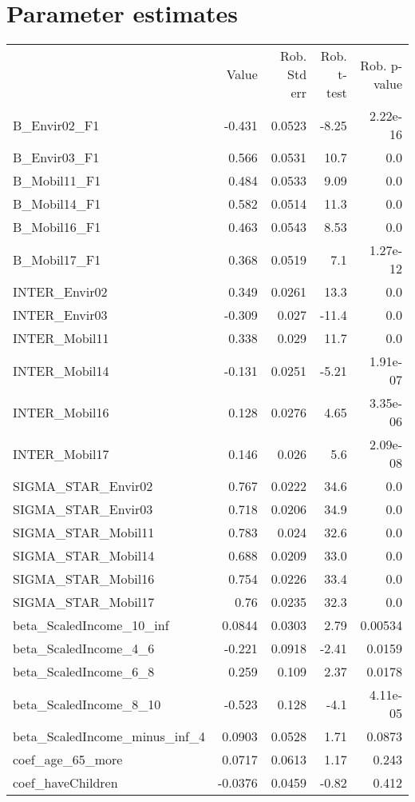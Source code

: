 \section{Parameter estimates}
\begin{tabular}{lrrrr}
 & Value & Rob. Std err & Rob. t-test & Rob. p-value \\
B_Envir02_F1 & -0.431 & 0.0523 & -8.25 & 2.22e-16 \\
B_Envir03_F1 & 0.566 & 0.0531 & 10.7 & 0.0 \\
B_Mobil11_F1 & 0.484 & 0.0533 & 9.09 & 0.0 \\
B_Mobil14_F1 & 0.582 & 0.0514 & 11.3 & 0.0 \\
B_Mobil16_F1 & 0.463 & 0.0543 & 8.53 & 0.0 \\
B_Mobil17_F1 & 0.368 & 0.0519 & 7.1 & 1.27e-12 \\
INTER_Envir02 & 0.349 & 0.0261 & 13.3 & 0.0 \\
INTER_Envir03 & -0.309 & 0.027 & -11.4 & 0.0 \\
INTER_Mobil11 & 0.338 & 0.029 & 11.7 & 0.0 \\
INTER_Mobil14 & -0.131 & 0.0251 & -5.21 & 1.91e-07 \\
INTER_Mobil16 & 0.128 & 0.0276 & 4.65 & 3.35e-06 \\
INTER_Mobil17 & 0.146 & 0.026 & 5.6 & 2.09e-08 \\
SIGMA_STAR_Envir02 & 0.767 & 0.0222 & 34.6 & 0.0 \\
SIGMA_STAR_Envir03 & 0.718 & 0.0206 & 34.9 & 0.0 \\
SIGMA_STAR_Mobil11 & 0.783 & 0.024 & 32.6 & 0.0 \\
SIGMA_STAR_Mobil14 & 0.688 & 0.0209 & 33.0 & 0.0 \\
SIGMA_STAR_Mobil16 & 0.754 & 0.0226 & 33.4 & 0.0 \\
SIGMA_STAR_Mobil17 & 0.76 & 0.0235 & 32.3 & 0.0 \\
beta_ScaledIncome_10_inf & 0.0844 & 0.0303 & 2.79 & 0.00534 \\
beta_ScaledIncome_4_6 & -0.221 & 0.0918 & -2.41 & 0.0159 \\
beta_ScaledIncome_6_8 & 0.259 & 0.109 & 2.37 & 0.0178 \\
beta_ScaledIncome_8_10 & -0.523 & 0.128 & -4.1 & 4.11e-05 \\
beta_ScaledIncome_minus_inf_4 & 0.0903 & 0.0528 & 1.71 & 0.0873 \\
coef_age_65_more & 0.0717 & 0.0613 & 1.17 & 0.243 \\
coef_haveChildren & -0.0376 & 0.0459 & -0.82 & 0.412 \\

\end{tabular}
